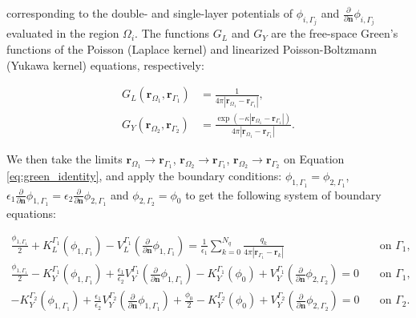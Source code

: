 \noindent corresponding to the double- and single-layer potentials of $\phi_{i,\Gamma_j}$ and $\frac{\partial}{\partial \mathbf{n}} \phi_{i,\Gamma_j}$ evaluated in the region $\Omega_i$. The functions $G_L$ and $G_Y$ are the free-space Green's functions of the Poisson (Laplace kernel) and linearized Poisson-Boltzmann (Yukawa kernel) equations, respectively:

\begin{align} \label{eq:free-space}
G_L(\mathbf{r}_{\Omega_1},\mathbf{r}_{\Gamma_1}) &= \frac{1}{4\pi|\mathbf{r}_{\Omega_1} - \mathbf{r}_{\Gamma_1}|}, \nonumber \\
G_Y(\mathbf{r}_{\Omega_2},\mathbf{r}_{\Gamma_2}) &= \frac{\exp \left( -\kappa |\mathbf{r}_{\Omega_1} - \mathbf{r}_{\Gamma_1}|\right)}{4\pi|\mathbf{r}_{\Omega_1} - \mathbf{r}_{\Gamma_1}|}.
\end{align}

\noindent We then take the limits 
$\mathbf{r}_{\Omega_1}\!\to\!\mathbf{r}_{\Gamma_1}$, 
$\mathbf{r}_{\Omega_2}\!\to\!\mathbf{r}_{\Gamma_1}$, 
$\mathbf{r}_{\Omega_2}\!\to\!\mathbf{r}_{\Gamma_2}$ on Equation \eqref{eq:green_identity}, and apply the boundary conditions:
$\phi_{1,\Gamma_1} = \phi_{2,\Gamma_1}$, 
$\epsilon_1\frac{\partial}{\partial \mathbf{n}} \phi_{1,\Gamma_1} =  \epsilon_2\frac{\partial}{\partial \mathbf{n}} \phi_{2,\Gamma_1} $ 
and $\phi_{2,\Gamma_2} = \phi_0$ to get the following system of boundary equations:

\vspace{1em}

%
\begin{align} \label{eq:integral_eq}
\frac{\phi_{1,\Gamma_1}}{2}+ K_{L}^{\Gamma_1}(\phi_{1,\Gamma_1}) -  V_{L}^{\Gamma_1} \left(\frac{\partial}{\partial \mathbf{n}}\phi_{1,\Gamma_1} \right)  =  
\frac{1}{\epsilon_1} \sum_{k=0}^{N_q} \frac{q_k}{4\pi|\mathbf{r}_{\Gamma_1} - \mathbf{r}_k|} &  \quad \text{on $\Gamma_1$,} \nonumber \\ 
\frac{\phi_{1,\Gamma_1}}{2} - K_{Y}^{\Gamma_1}(\phi_{1,\Gamma_1}) +  \frac{\epsilon_1}{\epsilon_2} V_{Y}^{\Gamma_1} \left( \frac{\partial}{\partial \mathbf{n}} \phi_{1,\Gamma_1} \right) -  
K_{Y}^{\Gamma_1}(\phi_{0})  + V_{Y}^{\Gamma_1} \left( \frac{\partial}{\partial \mathbf{n}} \phi_{2,\Gamma_2} \right)  = 0& \quad \text{on $\Gamma_1$,} \nonumber \\ 
- K_{Y}^{\Gamma_2}(\phi_{1,\Gamma_1}) + \frac{\epsilon_1}{\epsilon_2} V_{Y}^{\Gamma_2}  \left( \frac{\partial}{\partial \mathbf{n}} \phi_{1,\Gamma_1} \right) + \frac{\phi_{0}}{2} - 
K_{Y}^{\Gamma_2}(\phi_{0}) +  V_{Y}^{\Gamma_2} \left( \frac{\partial}{\partial \mathbf{n}} \phi_{2,\Gamma_2} \right)  = 0& \quad \text{on $\Gamma_2$.}
\end{align}


